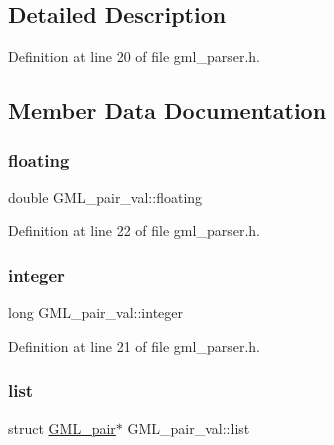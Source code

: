 \subsection{Detailed Description}


Definition at line 20 of file gml\+\_\+parser.\+h.



\subsection{Member Data Documentation}
\mbox{\label{union_g_m_l__pair__val_a83eecc4083fbf9dfe1608e027311df6c}} 
\subsubsection{\texorpdfstring{floating}{floating}}
{\footnotesize\ttfamily double G\+M\+L\+\_\+pair\+\_\+val\+::floating}



Definition at line 22 of file gml\+\_\+parser.\+h.

\mbox{\label{union_g_m_l__pair__val_a701b42178210e3460f15cc34bcd389ff}} 
\subsubsection{\texorpdfstring{integer}{integer}}
{\footnotesize\ttfamily long G\+M\+L\+\_\+pair\+\_\+val\+::integer}



Definition at line 21 of file gml\+\_\+parser.\+h.

\mbox{\label{union_g_m_l__pair__val_ad9d038864154789007178fbf4d43ec9d}} 
\subsubsection{\texorpdfstring{list}{list}}
{\footnotesize\ttfamily struct \mbox{\hyperlink{struct_g_m_l__pair}{G\+M\+L\+\_\+pair}}$\ast$ G\+M\+L\+\_\+pair\+\_\+val\+::list}



